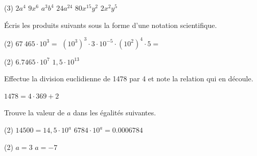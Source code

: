 \documentclass[parskip=half-,twoside=semi, DIV=12, 12pt]{scrartcl}
\begin{document}
\begin{solappliquer}
    \begin{tasks}(3)
        \task \(2a^4\)
        \task \(9x^6\)
        \task \(a^3b^4\)
        \task \(24a^{24}\)
        \task \(80x^{15}y^2\)
        \task \(2x^2y^5\)
    \end{tasks}
\end{solappliquer}
\begin{appliquer}[points=2]
    Écris les produits suivants sous la forme d'une notation scientifique.
    \begin{tasks}[after-skip=3.5cm](2)
        \task \(67\ 465 \cdot 10^{3} =\)
        \task \(\left( 10^{3} \right)^{3} \cdot 3 \cdot 10^{- 5} \cdot \left( 10^{2} \right)^{4} \cdot 5 =\)
    \end{tasks}
\end{appliquer}
\begin{solappliquer}
    \begin{tasks}(2)
        \task \(\num{6,7465} \cdot 10^7\)
        \task \(1,5 \cdot 10^{13}\)
    \end{tasks}
\end{solappliquer}
\begin{appliquer}[points=2]
    Effectue la division euclidienne de \num{1478} par 4 et note la relation qui en découle.
    \vspace*{5cm}
\end{appliquer}
\begin{solappliquer}
    \par
    \qquad
    \(\num{1478} = 4 \cdot 369 + 2\)
\end{solappliquer}
\begin{appliquer}[points=1]
    Trouve la valeur de \(a\) dans les égalités suivantes.
    \begin{tasks}[after-skip=1cm](2)
        \task \(\num{14500} = 14,5 \cdot 10^{a}\)
        \task \(\num{6784} \cdot 10^{a} = \num{0,0006784}\)
    \end{tasks}
\end{appliquer}
\begin{solappliquer}
    \begin{tasks}(2)
        \task \(a=3\)
        \task \(a=-7\)
    \end{tasks}
\end{solappliquer}
\end{document}
